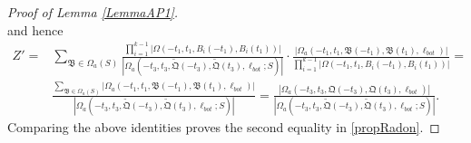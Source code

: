 \begin{proof}[Proof of Lemma \ref{LemmaAP1}]
\[	\]
	and hence
	\begin{equation*}
		\begin{split}
			Z' =&\sum_{\mathfrak{B}\in \Omega_a(S)}\frac{\prod_{i = 1}^{k-1}|\Omega(-t_1,t_1,B_i(-t_1),B_i(t_1))|}{|\Omega_a(-t_3,t_3,\tilde{\mathfrak{Q}}(-t_3),\tilde{\mathfrak{Q}}(t_3),\ell_{bot};S)|}\cdot\frac{|\Omega_a(-t_1,t_1,\mathfrak B(-t_1),\mathfrak{B}(t_1),\ell_{bot})|}{\prod_{i = 1}^{k-1}|\Omega(-t_1,t_1, B_i(-t_1),B_i(t_1))|}=\\ 
			&\frac{\sum_{\mathfrak{B}\in\Omega_a(S)}|\Omega_a(-t_1,t_1,\mathfrak B(-t_1),\mathfrak B(t_1),\ell_{bot})|}{|\Omega_a(-t_3,t_3,\tilde{\mathfrak{Q}}(-t_3),\tilde{\mathfrak{Q}}(t_3),\ell_{bot};S)|} = \frac{|\Omega_a(-t_3,t_3,{\mathfrak{Q}}(-t_3),{\mathfrak{Q}}(t_3),\ell_{bot})|}{|\Omega_a(-t_3,t_3,\tilde{\mathfrak{Q}}(-t_3),\tilde{\mathfrak{Q}}(t_3),\ell_{bot};S)|}.
		\end{split}
	\end{equation*}
	Comparing the above identities proves the second equality in \eqref{propRadon}.
	

\end{proof}

